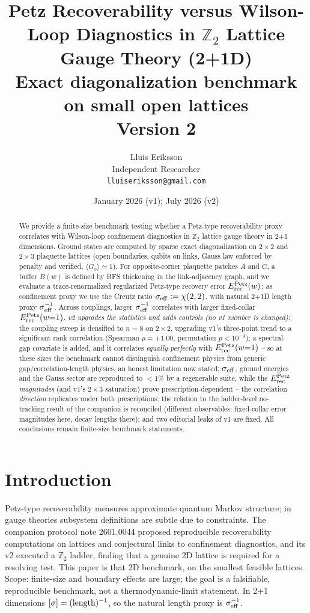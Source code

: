 \documentclass[11pt]{article}
\title{Petz Recoverability versus Wilson-Loop Diagnostics in $\mathbb{Z}_2$
Lattice Gauge Theory (2+1D)\\
{\large Exact diagonalization benchmark on small open lattices}\\
{\normalsize Version 2}}
\author{Lluis Eriksson\\ Independent Researcher\\ \texttt{lluiseriksson@gmail.com}}
\date{January 2026 (v1); July 2026 (v2)}
\theoremstyle{remark}
\newcommand{\Erec}{E^{\rm Petz}_{\rm rec}}
\begin{document}
\maketitle

\begin{abstract}
We provide a finite-size benchmark testing whether a Petz-type
recoverability proxy correlates with Wilson-loop confinement diagnostics
in $\mathbb{Z}_2$ lattice gauge theory in 2+1 dimensions. Ground states
are computed by sparse exact diagonalization on $2\times2$ and $2\times3$
plaquette lattices (open boundaries, qubits on links, Gauss law enforced
by penalty and verified, $\langle G_v\rangle \simeq 1$). For
opposite-corner plaquette patches $A$ and $C$, a buffer $B(w)$ is defined
by BFS thickening in the link-adjacency graph, and we evaluate a
trace-renormalized regularized Petz-type recovery error $\Erec(w)$;
as confinement proxy we use the Creutz ratio $\sigma_{\rm eff} :=
\chi(2,2)$, with natural 2+1D length proxy $\sigma_{\rm eff}^{-1}$.
Across couplings, larger $\sigma_{\rm eff}^{-1}$ correlates with larger
fixed-collar $\Erec(w{=}1)$. \emph{v2 upgrades the statistics and adds
controls (no v1 number is changed):} the coupling sweep is densified to
$n = 8$ on $2\times2$, upgrading v1's three-point trend to a significant
rank correlation (Spearman $\rho = +1.00$, permutation $p < 10^{-4}$);
a spectral-gap covariate is added, and it correlates \emph{equally
perfectly} with $\Erec(w{=}1)$ -- so at these sizes the benchmark cannot
distinguish confinement physics from generic gap/correlation-length
physics, an honest limitation now stated; $\sigma_{\rm eff}$, ground
energies and the Gauss sector are reproduced to $<1\%$ by a regenerable
suite, while the $\Erec$ \emph{magnitudes} (and v1's $2\times3$
saturation) prove prescription-dependent -- the correlation
\emph{direction} replicates under both prescriptions; the relation to the
ladder-level no-tracking result of the companion is reconciled (different
observables: fixed-collar error magnitudes here, decay lengths there);
and two editorial leaks of v1 are fixed. All conclusions remain
finite-size benchmark statements.
\end{abstract}

\section{Introduction}
Petz-type recoverability measures approximate quantum Markov structure;
in gauge theories subsystem definitions are subtle due to constraints.
The companion protocol note 2601.0044 \cite{S0044} proposed reproducible
recoverability computations on lattices and conjectural links to
confinement diagnostics, and its v2 executed a $\mathbb{Z}_2$ ladder,
finding that a genuine 2D lattice is required for a resolving test. This
paper is that 2D benchmark, on the smallest feasible lattices. Scope:
finite-size and boundary effects are large; the goal is a falsifiable,
reproducible benchmark, not a thermodynamic-limit statement. In 2+1
dimensions $[\sigma] = ({\rm length})^{-1}$, so the natural length proxy
is $\sigma_{\rm eff}^{-1}$.
\end{document}
